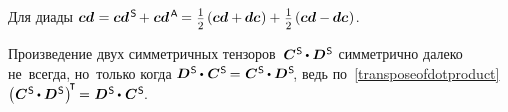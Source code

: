 \begin{otherlanguage}{russian}
\noindent Для диады ${\bm{c}\bm{d} \hspace{.1ex} = \bm{c}\bm{d}^{\mathsf{\hspace{.25ex}S}} \hspace{-0.2ex} + \hspace{.1ex} \bm{c}\bm{d}^{\mathsf{\hspace{.25ex}A}} \hspace{-0.16ex} = \hspace{.1ex}
\smalldisplaystyleonehalf \hspace{-0.1ex} \left( \bm{c}\bm{d} + \hspace{-0.1ex} \bm{d}\bm{c} \hspace{.1ex} \right)
+ \hspace{.16ex} \smalldisplaystyleonehalf \hspace{-0.1ex} \left( \bm{c} \bm{d} - \hspace{-0.1ex} \bm{d} \bm{c} \hspace{.1ex} \right)}$.

Произведение двух симметричных тензоров~${\bm{C}^{\mathsf{\hspace{.1ex}S}} \hspace{-0.1ex}\dotp \bm{D}^{\mathsf{\hspace{.1ex}S}}}$ симметрично далеко не~всегда, но~только когда ${\bm{D}^{\mathsf{\hspace{.1ex}S}} \hspace{-0.1ex}\dotp\hspace{.12ex} \bm{C}^{\mathsf{\hspace{.1ex}S}} \hspace{-0.2ex}=\hspace{.1ex} \bm{C}^{\mathsf{\hspace{.1ex}S}} \hspace{-0.1ex}\dotp \bm{D}^{\mathsf{\hspace{.1ex}S}}\hspace{-0.4ex}}$,
ведь по~\eqref{transposeofdotproduct} ${\left(\hspace{.08ex} \bm{C}^{\mathsf{\hspace{.1ex}S}} \hspace{-0.1ex}\dotp \bm{D}^{\mathsf{\hspace{.1ex}S}} \hspace{.1ex}\right)^{\hspace{-0.32ex}\T} \hspace{-0.16ex} = \hspace{.1ex} \bm{D}^{\mathsf{\hspace{.1ex}S}} \hspace{-0.1ex}\dotp\hspace{.12ex} \bm{C}^{\mathsf{\hspace{.1ex}S}} \hspace{-0.4ex}}$.


\end{otherlanguage}
